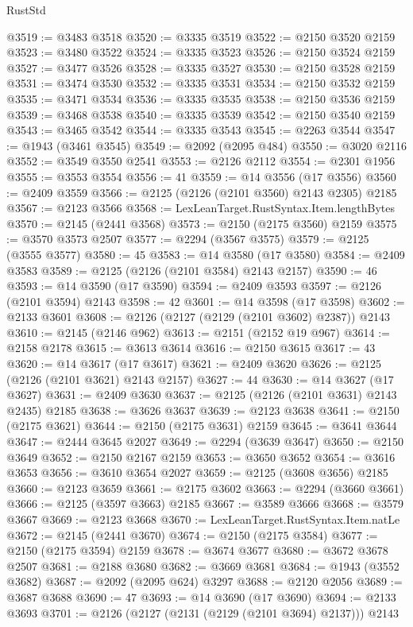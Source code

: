\begin{lexlean}{RustStd}
\begin{coremodule}
@3519 := @3483 @3518
@3520 := @3335 @3519
@3522 := @2150 @3520 @2159
@3523 := @3480 @3522
@3524 := @3335 @3523
@3526 := @2150 @3524 @2159
@3527 := @3477 @3526
@3528 := @3335 @3527
@3530 := @2150 @3528 @2159
@3531 := @3474 @3530
@3532 := @3335 @3531
@3534 := @2150 @3532 @2159
@3535 := @3471 @3534
@3536 := @3335 @3535
@3538 := @2150 @3536 @2159
@3539 := @3468 @3538
@3540 := @3335 @3539
@3542 := @2150 @3540 @2159
@3543 := @3465 @3542
@3544 := @3335 @3543
@3545 := @2263 @3544
@3547 := @1943 (@3461 @3545)
@3549 := @2092 (@2095 @484)
@3550 := @3020 @2116
@3552 := @3549 @3550 @2541
@3553 := @2126 @2112
@3554 := @2301 @1956
@3555 := @3553 @3554
@3556 := 41
@3559 := @14 @3556 (@17 @3556)
@3560 := @2409 @3559
@3566 := @2125 (@2126 (@2101 @3560) @2143 @2305) @2185
@3567 := @2123 @3566
@3568 := LexLeanTarget.RustSyntax.Item.lengthBytes
@3570 := @2145 (@2441 @3568)
@3573 := @2150 (@2175 @3560) @2159
@3575 := @3570 @3573 @2507
@3577 := @2294 (@3567 @3575)
@3579 := @2125 (@3555 @3577)
@3580 := 45
@3583 := @14 @3580 (@17 @3580)
@3584 := @2409 @3583
@3589 := @2125 (@2126 (@2101 @3584) @2143 @2157)
@3590 := 46
@3593 := @14 @3590 (@17 @3590)
@3594 := @2409 @3593
@3597 := @2126 (@2101 @3594) @2143
@3598 := 42
@3601 := @14 @3598 (@17 @3598)
@3602 := @2133 @3601
@3608 := @2126 (@2127 (@2129 (@2101 @3602) @2387)) @2143
@3610 := @2145 (@2146 @962)
@3613 := @2151 (@2152 @19 @967)
@3614 := @2158 @2178
@3615 := @3613 @3614
@3616 := @2150 @3615
@3617 := 43
@3620 := @14 @3617 (@17 @3617)
@3621 := @2409 @3620
@3626 := @2125 (@2126 (@2101 @3621) @2143 @2157)
@3627 := 44
@3630 := @14 @3627 (@17 @3627)
@3631 := @2409 @3630
@3637 := @2125 (@2126 (@2101 @3631) @2143 @2435) @2185
@3638 := @3626 @3637
@3639 := @2123 @3638
@3641 := @2150 (@2175 @3621)
@3644 := @2150 (@2175 @3631) @2159
@3645 := @3641 @3644
@3647 := @2444 @3645 @2027
@3649 := @2294 (@3639 @3647)
@3650 := @2150 @3649
@3652 := @2150 @2167 @2159
@3653 := @3650 @3652
@3654 := @3616 @3653
@3656 := @3610 @3654 @2027
@3659 := @2125 (@3608 @3656) @2185
@3660 := @2123 @3659
@3661 := @2175 @3602
@3663 := @2294 (@3660 @3661)
@3666 := @2125 (@3597 @3663) @2185
@3667 := @3589 @3666
@3668 := @3579 @3667
@3669 := @2123 @3668
@3670 := LexLeanTarget.RustSyntax.Item.natLe
@3672 := @2145 (@2441 @3670)
@3674 := @2150 (@2175 @3584)
@3677 := @2150 (@2175 @3594) @2159
@3678 := @3674 @3677
@3680 := @3672 @3678 @2507
@3681 := @2188 @3680
@3682 := @3669 @3681
@3684 := @1943 (@3552 @3682)
@3687 := @2092 (@2095 @624) @3297
@3688 := @2120 @2056
@3689 := @3687 @3688
@3690 := 47
@3693 := @14 @3690 (@17 @3690)
@3694 := @2133 @3693
@3701 := @2126 (@2127 (@2131 (@2129 (@2101 @3694) @2137))) @2143

\end{coremodule}
\end{lexlean}
